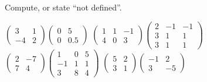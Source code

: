 \begin{exercises}
  \recommended \item 
    Compute, or state ``not defined''.
    \begin{exparts*}
      \partsitem
        $\begin{pmatrix}
          3  &1  \\
          -4 &2 
        \end{pmatrix}
        \begin{pmatrix}
          0  &5  \\
          0  &0.5
        \end{pmatrix}$
      \partsitem \(
        \begin{pmatrix}
          1  &1  &-1  \\
          4  &0  &3
        \end{pmatrix}
        \begin{pmatrix}
          2  &-1 &-1  \\
          3  &1  &1   \\
          3  &1  &1
        \end{pmatrix}   \)
      \partsitem \(
        \begin{pmatrix}
          2  &-7 \\
          7  &4
        \end{pmatrix}
        \begin{pmatrix}
          1  &0  &5   \\
         -1  &1  &1   \\
          3  &8  &4
        \end{pmatrix}   \)
      \partsitem \(
        \begin{pmatrix}
          5  &2  \\
          3  &1
        \end{pmatrix}
        \begin{pmatrix}
          -1  &2   \\
           3  &-5
        \end{pmatrix} \)
    \end{exparts*}
    \begin{answer} 
\end{answer}
\end{exercises}
